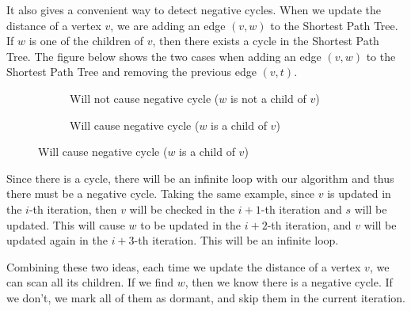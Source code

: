 \documentclass[a4paper,12pt]{article}
\begin{document}
It also gives a convenient way to detect negative cycles. 
When we update the distance of a vertex $v$, we are adding an edge $(v, w)$ to the Shortest Path Tree.
If $w$ is one of the children of $v$, then there exists a cycle in the Shortest Path Tree.
The figure below shows the two cases when adding an edge $(v, w)$ to the Shortest Path Tree and removing the previous edge $(v, t)$.
\begin{figure}[H]
	\begin{subfigure}[t]{.5\textwidth}
		\centering
		\caption{Will not cause negative cycle ($w$ is not a child of $v$)}
	\end{subfigure}
	\begin{subfigure}[t]{.5\textwidth}
		\centering
		\caption{Will cause negative cycle ($w$ is a child of $v$)}
	\end{subfigure}
\end{figure}

Since there is a cycle, there will be an infinite loop with our algorithm and thus there must be a negative cycle.
Taking the same example, since $v$ is updated in the $i$-th iteration, then $v$ will be checked in the $i+1$-th iteration and $s$ will be updated.
This will cause $w$ to be updated in the $i+2$-th iteration, and $v$ will be updated again in the $i+3$-th iteration.
This will be an infinite loop.

Combining these two ideas, each time we update the distance of a vertex $v$, we can scan all its children.
If we find $w$, then we know there is a negative cycle.
If we don't, we mark all of them as dormant, and skip them in the current iteration.
\end{document}

